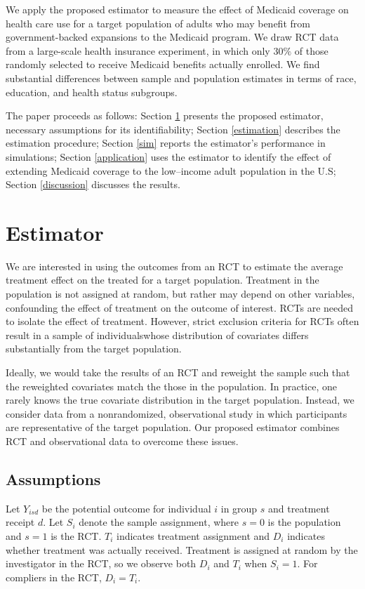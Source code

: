 \documentclass[hidelinks,12pt]{article}
\begin{document}
We apply the proposed estimator to measure the effect of Medicaid coverage on health care use for a target population of adults who may benefit from government-backed expansions to the Medicaid program. We draw RCT data from a large-scale health insurance experiment, in which only $30\%$ of those randomly selected to receive Medicaid benefits actually enrolled. We find substantial differences between sample and population estimates in terms of race, education, and health status subgroups. 

The paper proceeds as follows: Section \ref{estimator} presents the proposed estimator, necessary assumptions for its identifiability; {\color{red}Section \ref{estimation} describes the estimation procedure}; Section \ref{sim} reports the estimator's performance in simulations; Section \ref{application} uses the estimator to identify the effect of extending Medicaid coverage to the low--income adult population in the U.S; Section \ref{discussion} discusses the results. 

\section{Estimator} \label{estimator}
We are interested in using the outcomes from an RCT to estimate the average treatment effect on the treated for a target population. Treatment in the population is not assigned at random, but rather may depend on other variables, confounding the effect of treatment on the outcome of interest. RCTs are needed to isolate the effect of treatment. However, strict exclusion criteria for RCTs often result in a sample {\color{red}of individuals}whose distribution of covariates differs substantially from the target population. 

Ideally, we would take the results of an RCT and reweight the sample such that the reweighted covariates match the those in the population. In practice, one rarely knows the true covariate distribution in the target population. Instead, we consider data from a nonrandomized, observational study in which participants are representative of the target population. Our proposed estimator combines RCT and observational data to overcome these issues.

\subsection{Assumptions} \label{assumptions}
{\color{red}Let $Y_{isd}$ be the potential outcome for individual $i$ in group $s$ and treatment receipt $d$. Let $S_i$ denote the sample assignment, where $s=0$ is the population and $s=1$ is the RCT. $T_i$ indicates treatment assignment and $D_i$ indicates whether treatment was actually received. Treatment is assigned at random by the investigator in the RCT, so we observe both $D_i$ and $T_i$ when $S_i = 1$. For compliers in the RCT, $D_i = T_i$.} 
\end{document}
